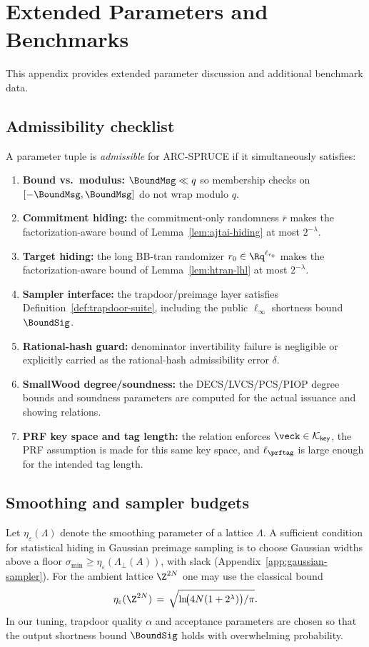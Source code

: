 \section{Extended Parameters and Benchmarks}
\label{app:ext-params}

This appendix provides extended parameter discussion and additional benchmark data.

\subsection{Admissibility checklist}
A parameter tuple is \emph{admissible} for ARC-SPRUCE if it simultaneously satisfies:
\begin{enumerate}[leftmargin=1.25em]
  \item \textbf{Bound vs.\ modulus:} \(\BoundMsg \ll q\) so membership checks on
  \([-\BoundMsg,\BoundMsg]\) do not wrap modulo \(q\).
  \item \textbf{Commitment hiding:} the commitment-only randomness \(\bar r\) makes the factorization-aware
  bound of Lemma~\ref{lem:ajtai-hiding} at most \(2^{-\lambda}\).
  \item \textbf{Target hiding:} the long BB-tran randomizer \(r_0\in\Rq^{\ell_{r_0}}\) makes the
  factorization-aware bound of Lemma~\ref{lem:htran-lhl} at most \(2^{-\lambda}\).
  \item \textbf{Sampler interface:} the trapdoor/preimage layer satisfies Definition~\ref{def:trapdoor-suite},
  including the public \(\ell_\infty\) shortness bound \(\BoundSig\).
  \item \textbf{Rational-hash guard:} denominator invertibility failure is negligible or explicitly carried as the
  rational-hash admissibility error \(\delta\).
  \item \textbf{SmallWood degree/soundness:} the DECS/LVCS/PCS/PIOP degree bounds and soundness parameters are
  computed for the actual issuance and showing relations.
  \item \textbf{PRF key space and tag length:} the relation enforces
  \(\veck\in\mathcal K_{\mathsf{key}}\), the PRF assumption is made for this same key space, and
  \(\ell_{\prftag}\) is large enough for the intended tag length.
\end{enumerate}

\subsection{Smoothing and sampler budgets}
Let \(\eta_\varepsilon(\Lambda)\) denote the smoothing parameter of a lattice \(\Lambda\). A sufficient condition for
statistical hiding in Gaussian preimage sampling is to choose Gaussian widths above a floor
\(\sigma_{\min}\ge \eta_\varepsilon(\Lambda_\perp(A))\), with slack (Appendix~\ref{app:gaussian-sampler}).
For the ambient lattice \(\Z^{2N}\) one may use the classical bound
\[
  \eta_\varepsilon(\Z^{2N})
  \,=\,
  \sqrt{\ln\!\bigl(4N(1+2^\lambda)\bigr)/\pi}.
\]
In our tuning, trapdoor quality \(\alpha\) and acceptance parameters are chosen so that the output shortness bound
\(\BoundSig\) holds with overwhelming probability.

